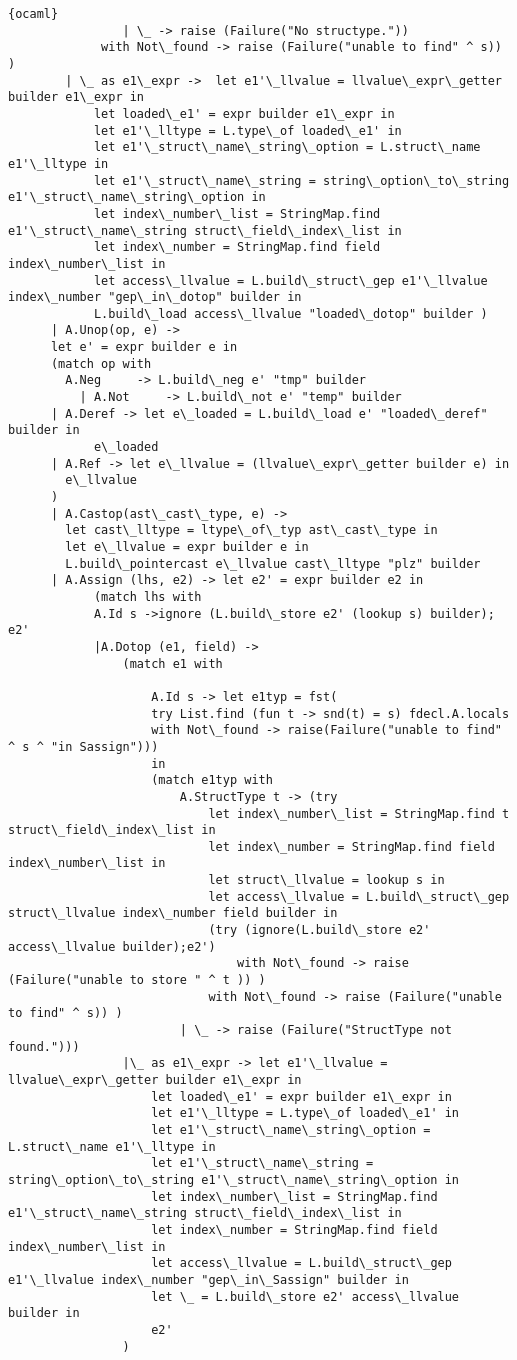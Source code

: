 \begin{lstlisting}{ocaml}
				| \_ -> raise (Failure("No structype."))
			 with Not\_found -> raise (Failure("unable to find" ^ s)) )
		| \_ as e1\_expr ->  let e1'\_llvalue = llvalue\_expr\_getter builder e1\_expr in
			let loaded\_e1' = expr builder e1\_expr in
			let e1'\_lltype = L.type\_of loaded\_e1' in
			let e1'\_struct\_name\_string\_option = L.struct\_name e1'\_lltype in
			let e1'\_struct\_name\_string = string\_option\_to\_string e1'\_struct\_name\_string\_option in
			let index\_number\_list = StringMap.find e1'\_struct\_name\_string struct\_field\_index\_list in
			let index\_number = StringMap.find field index\_number\_list in
			let access\_llvalue = L.build\_struct\_gep e1'\_llvalue index\_number "gep\_in\_dotop" builder in
			L.build\_load access\_llvalue "loaded\_dotop" builder )
      | A.Unop(op, e) ->
	  let e' = expr builder e in
	  (match op with
	    A.Neg     -> L.build\_neg e' "tmp" builder
          | A.Not     -> L.build\_not e' "temp" builder
	  | A.Deref -> let e\_loaded = L.build\_load e' "loaded\_deref" builder in
			e\_loaded
	  | A.Ref -> let e\_llvalue = (llvalue\_expr\_getter builder e) in
		e\_llvalue
	  )
      | A.Castop(ast\_cast\_type, e) ->
 		let cast\_lltype = ltype\_of\_typ ast\_cast\_type in
		let e\_llvalue = expr builder e in
		L.build\_pointercast e\_llvalue cast\_lltype "plz" builder
      | A.Assign (lhs, e2) -> let e2' = expr builder e2 in
			(match lhs with
			A.Id s ->ignore (L.build\_store e2' (lookup s) builder); e2'
			|A.Dotop (e1, field) ->
				(match e1 with 			
					
					A.Id s -> let e1typ = fst(
					try List.find (fun t -> snd(t) = s) fdecl.A.locals
					with Not\_found -> raise(Failure("unable to find" ^ s ^ "in Sassign")))
					in
					(match e1typ with
						A.StructType t -> (try 
							let index\_number\_list = StringMap.find t struct\_field\_index\_list in
							let index\_number = StringMap.find field index\_number\_list in
							let struct\_llvalue = lookup s in
							let access\_llvalue = L.build\_struct\_gep struct\_llvalue index\_number field builder in
							(try (ignore(L.build\_store e2' access\_llvalue builder);e2')
								with Not\_found -> raise (Failure("unable to store " ^ t )) )
							with Not\_found -> raise (Failure("unable to find" ^ s)) )
						| \_ -> raise (Failure("StructType not found.")))
				|\_ as e1\_expr -> let e1'\_llvalue = llvalue\_expr\_getter builder e1\_expr in 
					let loaded\_e1' = expr builder e1\_expr in
					let e1'\_lltype = L.type\_of loaded\_e1' in
					let e1'\_struct\_name\_string\_option = L.struct\_name e1'\_lltype in
					let e1'\_struct\_name\_string = string\_option\_to\_string e1'\_struct\_name\_string\_option in
					let index\_number\_list = StringMap.find e1'\_struct\_name\_string struct\_field\_index\_list in
					let index\_number = StringMap.find field index\_number\_list in
					let access\_llvalue = L.build\_struct\_gep e1'\_llvalue index\_number "gep\_in\_Sassign" builder in
					let \_ = L.build\_store e2' access\_llvalue builder in
					e2'
				)
			

\end{lstlisting}

